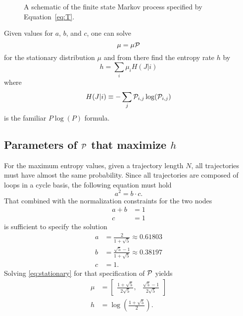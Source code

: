 \documentclass[12pt]{article} \usepackage{amsmath,amsfonts}
\newcommand{\T}{{\cal P}}
\begin{document}
\begin{figure*}
  \centering
  \resizebox{0.4\textwidth}{!}{ }
  \caption{A schematic of the finite state Markov process specified by
  Equation~\eqref{eq:T}.}
  \label{fig:mt2}
\end{figure*}

Given values for $a$, $b$, and $c$, one can solve
\begin{equation}
  \label{eq:stationary}
  \mu = \mu \T
\end{equation}
for the stationary distribution $\mu$ and from there find the entropy
rate $h$ by
\begin{equation}
  \label{eq:rate}
  h = \sum_i \mu_i H(J|i)
\end{equation}
where
\begin{equation*}
  H(J|i) \equiv -\sum_j \T_{i,j} \log (\T_{i,j})
\end{equation*}
is the familiar $P\log(P)$ formula.

\subsection{Parameters of $\T$ that maximize $h$}
\label{sec:max}

For the maximum entropy values, given a trajectory length $N$, all
trajectories must have almost the same probability.  Since all
trajectories are composed of loops in a cycle basis, the following
equation must hold
\begin{equation}
  \label{eq:excycle}
  a^2 = b\cdot c.
\end{equation}
That combined with the normalization constraints for the two nodes
\begin{align*}
  a + b &= 1 \\
  c &= 1
\end{align*}
is sufficient to specify the solution
\begin{align*}
  a &= \frac{2}{1+\sqrt{5}} \approx          0.61803\\
  b &= \frac{\sqrt{5}-1}{1+\sqrt{5}} \approx 0.38197\\
  c &= 1.
\end{align*}
Solving \eqref{eq:stationary} for that specification of $\T$ yields
\begin{align*}
  \mu &=  \begin{bmatrix} \frac{1+\sqrt{5}}{2\sqrt{5}}, &
    \frac{\sqrt{5}-1}{2\sqrt{5}} \end{bmatrix} \\
  h &= \log\left(\frac{1+\sqrt{5}}{2}\right).
\end{align*}
\end{document}
